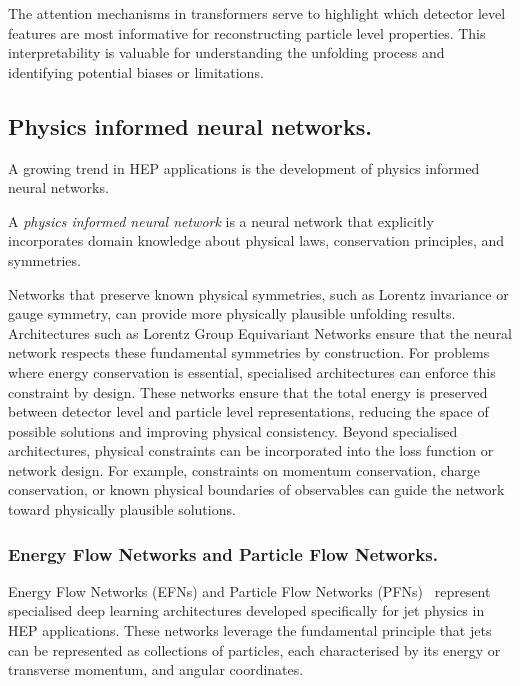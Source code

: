     The attention mechanisms in transformers serve to highlight which detector level features are most informative for reconstructing particle level properties.
    This interpretability is valuable for understanding the unfolding process and identifying potential biases or limitations.
    
\subsection{Physics informed neural networks.}

    A growing trend in HEP applications is the development of physics informed neural networks.
    
    \begin{definition}
    A \emph{physics informed neural network} is a neural network that explicitly incorporates domain knowledge about physical laws, conservation principles, and symmetries.
    \end{definition}
    
    Networks that preserve known physical symmetries, such as Lorentz invariance or gauge symmetry, can provide more physically plausible unfolding results.
    Architectures such as Lorentz Group Equivariant Networks\cite{Bogatskiy2020LorentzPhysics} ensure that the neural network respects these fundamental symmetries by construction.
    For problems where energy conservation is essential, specialised architectures can enforce this constraint by design.
    These networks ensure that the total energy is preserved between detector level and particle level representations, reducing the space of possible solutions and improving physical consistency.
    Beyond specialised architectures, physical constraints can be incorporated into the loss function or network design.
    For example, constraints on momentum conservation, charge conservation, or known physical boundaries of observables can guide the network toward physically plausible solutions.

    \subsubsection{Energy Flow Networks and Particle Flow Networks.}
    
        Energy Flow Networks (EFNs) and Particle Flow Networks (PFNs)~\cite{Komiske2019EnergyJets} represent specialised deep learning architectures developed specifically for jet physics in HEP applications.
        These networks leverage the fundamental principle that jets can be represented as collections of particles, each characterised by its energy or transverse momentum, and angular coordinates.

